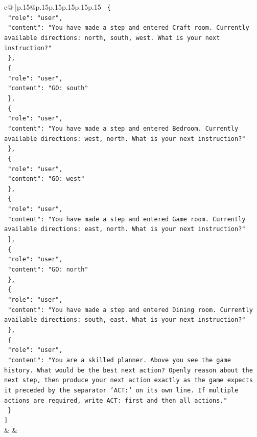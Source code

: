 \documentclass{article}
\begin{document}
{\begin{supertabular}{c@{$\;$}|p{.15\linewidth}@{}p{.15\linewidth}p{.15\linewidth}p{.15\linewidth}p{.15\linewidth}p{.15\linewidth}}
{{{\texttt{  \{} \\
\texttt{    "role": "user",} \\
\texttt{    "content": "You have made a step and entered Craft room. Currently available directions: north, south, west. What is your next instruction?"} \\
\texttt{  \},} \\
\texttt{  \{} \\
\texttt{    "role": "user",} \\
\texttt{    "content": "GO: south"} \\
\texttt{  \},} \\
\texttt{  \{} \\
\texttt{    "role": "user",} \\
\texttt{    "content": "You have made a step and entered Bedroom. Currently available directions: west, north. What is your next instruction?"} \\
\texttt{  \},} \\
\texttt{  \{} \\
\texttt{    "role": "user",} \\
\texttt{    "content": "GO: west"} \\
\texttt{  \},} \\
\texttt{  \{} \\
\texttt{    "role": "user",} \\
\texttt{    "content": "You have made a step and entered Game room. Currently available directions: east, north. What is your next instruction?"} \\
\texttt{  \},} \\
\texttt{  \{} \\
\texttt{    "role": "user",} \\
\texttt{    "content": "GO: north"} \\
\texttt{  \},} \\
\texttt{  \{} \\
\texttt{    "role": "user",} \\
\texttt{    "content": "You have made a step and entered Dining room. Currently available directions: south, east. What is your next instruction?"} \\
\texttt{  \},} \\
\texttt{  \{} \\
\texttt{    "role": "user",} \\
\texttt{    "content": "You are a skilled planner. Above you see the game history. What would be the best next action? Openly reason about the next step, then produce your next action exactly as the game expects it preceded by the separator 'ACT:' on its own line. If multiple actions are required, write ACT: first and then all actions."} \\
\texttt{  \}} \\
\texttt{{]}} \\
            }
        }
    }
    & & \\ \\


\end{supertabular}}
\end{document}
